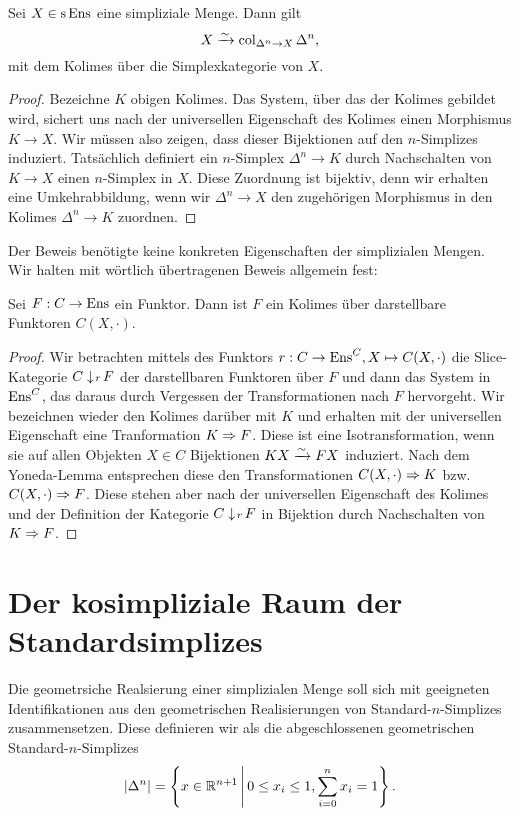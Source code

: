 \begin{lemma} \label{sset-col}
  Sei $X \in \operatorname{s}\operatorname{Ens}$ eine simpliziale Menge. Dann gilt
  \[ X \xrightarrow[]{\sim} \operatorname{col}_{\Delta^n \to X} \Delta^n, \]
  mit dem Kolimes über die Simplexkategorie von $X$.
\end{lemma}
\begin{proof}
  Bezeichne $K$ obigen Kolimes. Das System, über das der Kolimes
  gebildet wird, sichert uns nach der universellen Eigenschaft des
  Kolimes einen Morphismus $K \to X$. Wir müssen also zeigen, dass
  dieser Bijektionen auf den $n$-Simplizes induziert. Tatsächlich
  definiert ein $n$-Simplex $\Delta^n \to K$ durch Nachschalten von
  $K \to X$ einen $n$-Simplex in $X$. Diese Zuordnung ist bijektiv,
  denn wir erhalten eine Umkehrabbildung, wenn wir $\Delta^n \to X$
  den zugehörigen Morphismus in den Kolimes $\Delta^n \to K$ zuordnen.
\end{proof}
Der Beweis benötigte keine konkreten Eigenschaften der simplizialen
Mengen. Wir halten mit wörtlich übertragenen Beweis allgemein fest:
\begin{prop}
  Sei $F: C \to \operatorname{Ens}$ ein Funktor. Dann ist $F$ ein Kolimes über
  darstellbare Funktoren $C(X, \cdot)$.
\end{prop}
\begin{proof}
  Wir betrachten mittels des Funktors $r: C \to \operatorname{Ens}^C, X \mapsto
  C(X, \cdot)$ die Slice-Kategorie $C \downarrow \! {\scriptstyle r} \, F$ der
  darstellbaren Funktoren über $F$ und dann das System in $\operatorname{Ens}^C$,
  das daraus durch Vergessen der Transformationen nach $F$
  hervorgeht. Wir bezeichnen wieder den Kolimes darüber mit $K$ und
  erhalten mit der universellen Eigenschaft eine Tranformation
  $K \Rightarrow F$. Diese ist eine Isotransformation, wenn sie auf allen
  Objekten $X \in C$ Bijektionen $KX \xrightarrow[]{\sim} FX$ induziert. Nach dem
  Yoneda-Lemma entsprechen diese den Transformationen
  $C(X, \cdot) \Rightarrow K$ bzw. $C(X, \cdot) \Rightarrow F$. Diese stehen
  aber nach der universellen Eigenschaft des Kolimes und der
  Definition der Kategorie $C \downarrow \! {\scriptstyle r} \, F$ in Bijektion durch
  Nachschalten von $K \Rightarrow F$.
\end{proof}

\section{Der kosimpliziale Raum der Standardsimplizes}

Die geometrsiche Realsierung einer simplizialen Menge soll sich mit
geeigneten Identifikationen aus den geometrischen Realisierungen von
Standard-$n$-Simplizes zusammensetzen. Diese definieren wir als die
abgeschlossenen geometrischen Standard-$n$-Simplizes
\[ |\Delta^n| = \left\{ x \in \mathbb{R}^{n+1} \,\middle|\, 0 \leq x_i \leq 1, \sum_{i=0}^n x_i = 1 \right\}. \]


